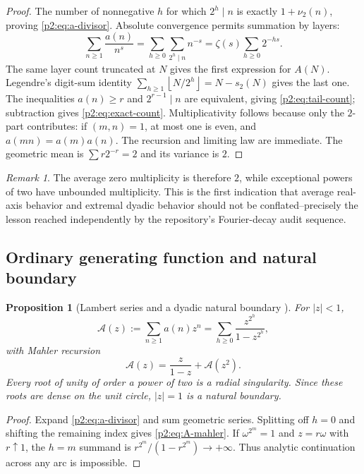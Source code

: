 \documentclass[11pt]{article}
\numberwithin{equation}{section}
\newtheorem{proposition}[theorem]{Proposition}
\theoremstyle{definition}
\theoremstyle{remark}
\newtheorem{remark}[theorem]{Remark}
\newcommand{\floor}[1]{\left\lfloor#1\right\rfloor}
\begin{document}
\begin{proof}
The number of nonnegative $h$ for which $2^h\mid n$ is exactly
$1+\nu_2(n)$, proving \eqref{p2:eq:a-divisor}.  Absolute convergence permits
summation by layers:
\[
 \sum_{n\ge1}\frac{a(n)}{n^s}
 =\sum_{h\ge0}\sum_{2^h\mid n}n^{-s}
 =\zeta(s)\sum_{h\ge0}2^{-hs}.
\]
The same layer count truncated at $N$ gives the first expression for $A(N)$.
Legendre's digit-sum identity
$\sum_{h\ge1}\floor{N/2^h}=N-s_2(N)$ gives the last one.
The inequalities $a(n)\ge r$ and $2^{r-1}\mid n$ are equivalent, giving
\eqref{p2:eq:tail-count}; subtraction gives \eqref{p2:eq:exact-count}.
Multiplicativity follows because only the $2$-part contributes: if $(m,n)=1$,
at most one is even, and $a(mn)=a(m)a(n)$.  The recursion and limiting law are
immediate.  The geometric mean is $\sum r2^{-r}=2$ and its variance is $2$.
\end{proof}

\begin{remark}
The average zero multiplicity is therefore $2$, while exceptional powers of two
have unbounded multiplicity.  This is the first indication that average real-axis
behavior and extremal dyadic behavior should not be conflated--precisely the
lesson reached independently by the repository's Fourier-decay audit sequence.
\end{remark}

\subsection{Ordinary generating function and natural boundary}

\begin{proposition}[Lambert series and a dyadic natural boundary \NewResult]
\label{p2:prop:ogf}
For $|z|<1$,
\begin{equation}
 \mathcal A(z):=\sum_{n\ge1}a(n)z^n
 =\sum_{h\ge0}\frac{z^{2^h}}{1-z^{2^h}},                  \label{p2:eq:A-ogf}
\end{equation}
with Mahler recursion
\begin{equation}
 \mathcal A(z)=\frac{z}{1-z}+\mathcal A(z^2).              \label{p2:eq:A-mahler}
\end{equation}
Every root of unity of order a power of two is a radial singularity.  Since these
roots are dense on the unit circle, $|z|=1$ is a natural boundary.
\end{proposition}

\begin{proof}
Expand \eqref{p2:eq:a-divisor} and sum geometric series.  Splitting off $h=0$
and shifting the remaining index gives \eqref{p2:eq:A-mahler}.  If $\omega^{2^m}=1$
and $z=r\omega$ with $r\uparrow1$, the $h=m$ summand is
$r^{2^m}/(1-r^{2^m})\to+\infty$.  Thus analytic continuation across any arc is
impossible.
\end{proof}
\end{document}
